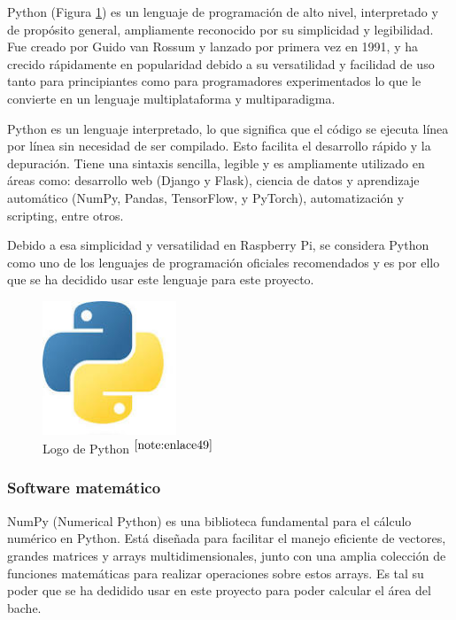 Python (Figura \ref{fig:python}) es un lenguaje de programación de alto nivel, interpretado y de propósito general, ampliamente reconocido por su simplicidad y legibilidad. Fue creado por Guido van Rossum y lanzado por primera vez en 1991, y ha crecido rápidamente en popularidad debido a su versatilidad y facilidad de uso tanto para principiantes como para programadores experimentados lo que le convierte en un lenguaje multiplataforma y multiparadigma.

Python es un lenguaje interpretado, lo que significa que el código se ejecuta línea por línea sin necesidad de ser compilado. Esto facilita el desarrollo rápido y la depuración. Tiene una sintaxis sencilla, legible y es ampliamente utilizado en áreas como: desarrollo web (Django y Flask), ciencia de datos y aprendizaje automático (NumPy, Pandas, TensorFlow, y PyTorch), automatización y scripting, entre otros.

Debido a esa simplicidad y versatilidad en Raspberry Pi, se considera Python como uno de los lenguajes de programación oficiales recomendados y es por ello que se ha decidido usar este lenguaje para este proyecto.

\begin{figure} [h!]
	\begin{center}
		\includegraphics[width=4cm]{figs/python.png}
	\end{center}
	\caption{Logo de Python $^{\ref{note:enlace49}}$} 
	\label{fig:python}
\end{figure}

\setcounter{footnote}{49} %

\subsubsection{Software matemático}

NumPy (Numerical Python) es una biblioteca fundamental para el cálculo numérico en Python. Está diseñada para facilitar el manejo eficiente de vectores, grandes matrices y arrays multidimensionales, junto con una amplia colección de funciones matemáticas para realizar operaciones sobre estos arrays. Es tal su poder que se ha dedidido usar en este proyecto para poder calcular el área del bache.

